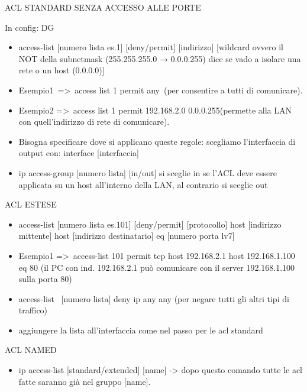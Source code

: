 \documentclass[
]{article}
\providecommand{\tightlist}{%
  \setlength{\itemsep}{0pt}\setlength{\parskip}{0pt}}
\begin{document}
{ACL STANDARD SENZA ACCESSO ALLE PORTE}

{In config: DG}

\begin{itemize}
\tightlist
\item
  {access-list {[}numero lista es.1{]} {[}deny/permit{]} {[}indirizzo{]}
  {[}wildcard ovvero il NOT della subnetmask (255.255.255.0 → 0.0.0.255)
  }{dice se vado a isolare una rete o un }{host (0.0.0.0){]}}
\item
  {Esempio1}{~=\textgreater{}}{~}{access list 1 permit any}{~(per
  consentire a tutti di comunicare).}
\item
  {Esempio2 =\textgreater{}}{~}{access list 1 permit 192.168.2.0
  0.0.0.255}{(permette alla LAN con quell'indirizzo di rete di
  comunicare).}
\item
  {Bisogna specificare dove si applicano queste regole: scegliamo
  l'interfaccia di output con: }{interface {[}interfaccia{]}}
\item
  {ip access-group {[}numero lista{]} {[}in/out{]} }{si sceglie }{in
  }{se l'ACL deve essere applicata su un host all'interno della LAN, al
  contrario si sceglie }{out}
\end{itemize}

{}

{ACL ESTESE}

\begin{itemize}
\tightlist
\item
  {access-list {[}numero lista es.101{]} {[}deny/permit{]}
  {[}protocollo{]} host {[}indirizzo mittente{]} host {[}indirizzo
  destinatario{]} eq {[}numero porta lv7{]}}
\item
  {Esempio1 =\textgreater{}}{~}{access-list 101 permit tcp host
  192.168.2.1 host 192.168.1.100 eq 80 }{(il PC con ind. 192.168.2.1 può
  comunicare con il server 192.168.1.100 sulla porta 80)}
\item
  {access-list ~{[}numero lista{]} deny ip any any }{(per negare tutti
  gli altri tipi di traffico)}
\item
  {aggiungere la lista all'interfaccia come nel passo per le acl
  standard}
\end{itemize}

{}

{ACL NAMED}

\begin{itemize}
\tightlist
\item
  {ip }{access-list {[}standard/extended{]} {[}name{]} }{-\textgreater{}
  dopo questo comando tutte le acl fatte saranno già nel gruppo
  {[}name{]}.}
\end{itemize}
\end{document}
